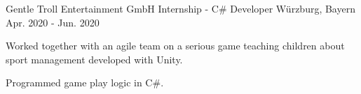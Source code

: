 \begin{cventries}
  \cventry
    {Gentle Troll Entertainment GmbH} %
    {Internship - C\# Developer} %
    {Würzburg, Bayern} %
    {Apr. 2020 - Jun. 2020} %
    {
      \begin{cvitems} %
        \item {Worked together with an agile team on a serious game teaching children about sport management developed with Unity.}
        \item {Programmed game play logic in C\#.}
      \end{cvitems}
    }


\end{cventries}
